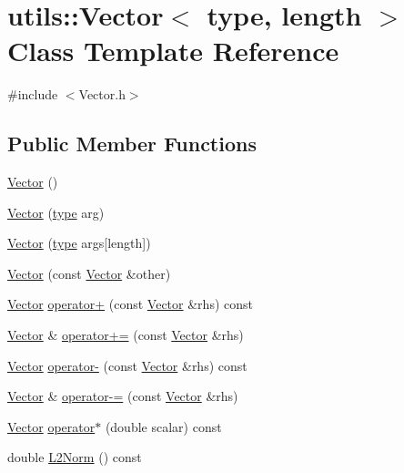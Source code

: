 \hypertarget{classutils_1_1Vector}{}\section{utils\+:\+:Vector$<$ type, length $>$ Class Template Reference}
\label{classutils_1_1Vector}


{\ttfamily \#include $<$Vector.\+h$>$}

\subsection*{Public Member Functions}
\begin{DoxyCompactItemize}
\item 
\hyperlink{classutils_1_1Vector_a71b42b489a54eb7eae82cff54fae0e12}{Vector} ()
\item 
\hyperlink{classutils_1_1Vector_a5f7d3385f6db28e1376d16e46f1a485f}{Vector} (\hyperlink{classtype}{type} arg)
\item 
\hyperlink{classutils_1_1Vector_a61a6f07c23829b70273ab4578bbb2332}{Vector} (\hyperlink{classtype}{type} args\mbox{[}length\mbox{]})
\item 
\hyperlink{classutils_1_1Vector_abb684db142444c4b19e6cd854db1a0d8}{Vector} (const \hyperlink{classutils_1_1Vector}{Vector} \&other)
\item 
\hyperlink{classutils_1_1Vector}{Vector} \hyperlink{classutils_1_1Vector_aeb0edeaa6b74a48839892e16623b0949}{operator+} (const \hyperlink{classutils_1_1Vector}{Vector} \&rhs) const 
\item 
\hyperlink{classutils_1_1Vector}{Vector} \& \hyperlink{classutils_1_1Vector_aa98dd61c4277e7e203292fcda5e68a69}{operator+=} (const \hyperlink{classutils_1_1Vector}{Vector} \&rhs)
\item 
\hyperlink{classutils_1_1Vector}{Vector} \hyperlink{classutils_1_1Vector_ad6e42a80810a58993f39e1d876eb5716}{operator-\/} (const \hyperlink{classutils_1_1Vector}{Vector} \&rhs) const 
\item 
\hyperlink{classutils_1_1Vector}{Vector} \& \hyperlink{classutils_1_1Vector_abe90a3569989271093c64363707d9cad}{operator-\/=} (const \hyperlink{classutils_1_1Vector}{Vector} \&rhs)
\item 
\hyperlink{classutils_1_1Vector}{Vector} \hyperlink{classutils_1_1Vector_a655ed48c281bfb1c87901313eb1896bb}{operator$\ast$} (double scalar) const 
\item 
double \hyperlink{classutils_1_1Vector_aa54009b6a76a8059de0eccbe43524d0c}{L2\+Norm} () const 

\end{DoxyCompactItemize}

